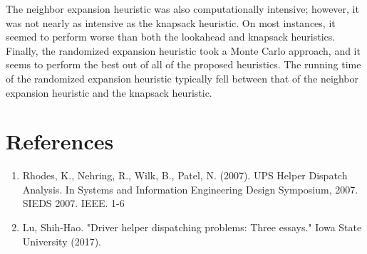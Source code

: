 \documentclass[12pt]{scrartcl}
\begin{document}
The neighbor expansion heuristic was also computationally intensive; however, it was not nearly as intensive as the knapsack heuristic. On most instances, it seemed to perform worse than both the lookahead and knapsack heuristics. Finally, the randomized expansion heuristic took a Monte Carlo approach, and it seems to perform the best out of all of the proposed heuristics. The running time of the randomized expansion heuristic typically fell between that of the neighbor expansion heuristic and the knapsack heuristic. 


\appendix

\newpage

\section*{References}

\begin{enumerate}
    \item Rhodes, K., Nehring, R., Wilk, B., Patel, N. (2007). UPS Helper Dispatch Analysis. In Systems and Information Engineering Design Symposium, 2007. SIEDS 2007. IEEE. 1-6
    \item Lu, Shih-Hao. "Driver helper dispatching problems: Three essays." Iowa State University (2017).
\end{enumerate}
\end{document}
